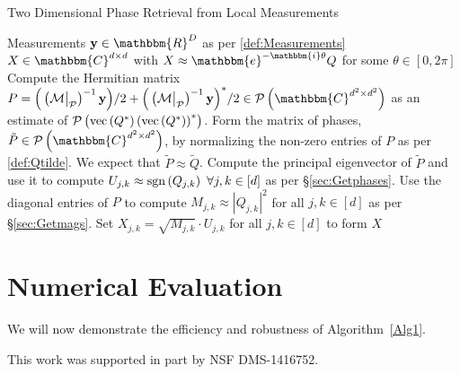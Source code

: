 \documentclass[]{spie}  %
\def \x {\mathbf x}
\def \y {\mathbf y}
\def \sgn {{\rm sgn}}
\begin{document}
\begin{algorithm}
\renewcommand{\algorithmicrequire}{\textbf{Input:}}
\renewcommand{\algorithmicensure}{\textbf{Output:}}
\caption{Two Dimensional Phase Retrieval from Local Measurements}
\label{Alg1}
\begin{algorithmic}[1]
    \REQUIRE Measurements $\y\in \mathbbm{R}^D$ as per \eqref{def:Measurements}
    \ENSURE $X \in \mathbbm{C}^{d \times d}$ with $X \approx \mathbbm{e}^{-\mathbbm{i} \theta} Q$ for some $\theta \in [0, 2 \pi]$ 
    \STATE Compute the Hermitian matrix $P = \Big( \left(\mathcal{M} \big|_{\mathcal{P}}\right)^{-1} {\bf y}\Big)/2 + \Big( \left(\mathcal{M} \big|_{\mathcal{P}}\right)^{-1} {\bf y}\Big)^*/2  \in \mathcal{P}\left(\mathbbm{C}^{d^2\times d^2}\right)$ as an estimate of $\mathcal{P} \left( {\rm vec}\left(Q^* \right) \left( {\rm vec} \left(Q^* \right) \right)^* \right)$.
    \STATE Form the matrix of phases, $\tilde{P} \in \mathcal{P}\left(\mathbbm{C}^{d^2\times d^2}\right)$, by normalizing the non-zero entries of $P$ as per \eqref{def:Qtilde}.  We expect that $\tilde{P} \approx \tilde{Q}$.
    \STATE Compute the principal eigenvector of $\tilde{P}$ and use it to compute $U_{j,k} \approx \sgn\left( Q_{j,k}\right) ~\forall j,k \in [d]$ as per \S\ref{sec:Getphases}.
    \STATE Use the diagonal entries of $P$ to compute $M_{j,k} \approx \left| Q_{j,k} \right|^2$ for all $j,k \in [d]$ as per \S\ref{sec:Getmags}.
    \STATE Set $X_{j,k} = \sqrt{M_{j,k}} \cdot U_{j,k}$ for all $j,k \in [d]$ to form $X$
    \end{algorithmic}
\end{algorithm}

\section{Numerical Evaluation}
\label{sec:Numerics}

We will now demonstrate the efficiency and robustness of Algorithm~\ref{Alg1}.


\acknowledgments %
 
This work was supported in part by NSF DMS-1416752.%

\end{document}
